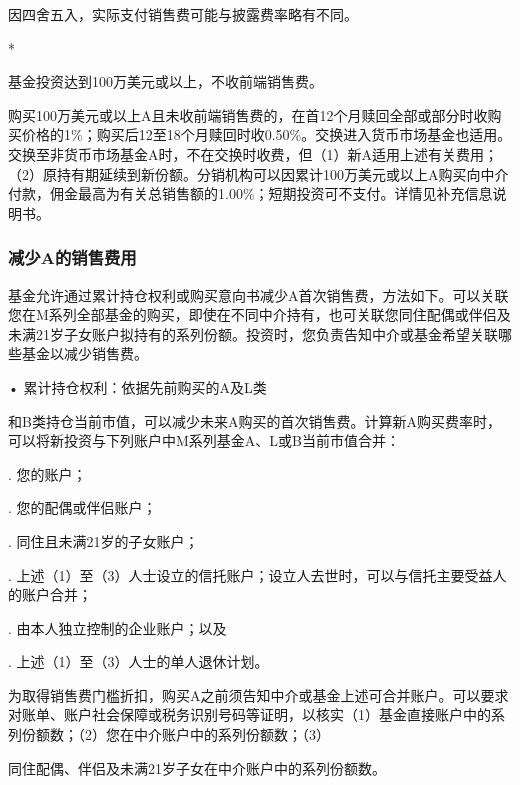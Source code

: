 \documentclass[UTF8,fontset=none,11pt,a4paper]{ctexart}
\begin{document}
 因四舍五入，实际支付销售费可能与披露费率\allowbreak\mbox{略有不同。}\par\smallskip
*

基金投资达到100万美元或以上，不收前\allowbreak\mbox{端销售费。}


\textbf{}

购买100万美元或以上A且未收前端销售费的，在首12个月赎回全部或部分时收购买价格的1\%；购买后12至18个月赎回时收0.50\%。交换进入货币市场基金也适用。交换至非货币市场基金A时，不在交换时收费，但（1）新A适用上述有关费用；（2）原持有期延续到新份额。分销机构可以因累计100万美元或以上A购买向中介付款，佣金最高为有关总销售额的1.00\%；短期投资可不支付。详情见补充信\allowbreak\mbox{息说明书。}


\subsubsection*{减少A的销售费用}
基金允许通过累计持仓权利或购买意向书减少A首次销售费，方法如下。可以关联您在M系列全部基金的购买，即使在不同中介持有，也可关联您同住配偶或伴侣及未满21岁子女账户拟持有的系列份额。投资时，您负责告知中介或基金希望关联哪些基金以减\allowbreak\mbox{少销售费。}

\noindent • 累计持仓权利：依据先前购买的A及L类\par\smallskip

\par{}\label{originalpage14}

和B类持仓当前市值，可以减少未来A购买的首次销售费。计算新A购买费率时，可以将新投资与下列账户中M系列基金A、L或B当前\allowbreak\mbox{市值合并：}


. \allowbreak\mbox{您的账户；}


. 您的配偶或\allowbreak\mbox{伴侣账户；}


. 同住且未满21岁的\allowbreak\mbox{子女账户；}


. 上述（1）至（3）人士设立的信托账户；设立人去世时，可以与信托主要受益人的\allowbreak\mbox{账户合并；}


. 由本人独立控制的企业账户；以及


. 上述（1）至（3）人士的单人\allowbreak\mbox{退休计划。}


为取得销售费门槛折扣，购买A之前须告知中介或基金上述可合并账户。可以要求对账单、账户社会保障或税务识别号码等证明，以核实（1）基金直接账户中的系列份额数；（2）您在中介账户中的系列份额数；（3）

同住配偶、伴侣及未满21岁子女在中介账户中的系\allowbreak\mbox{列份额数。}
\end{document}
